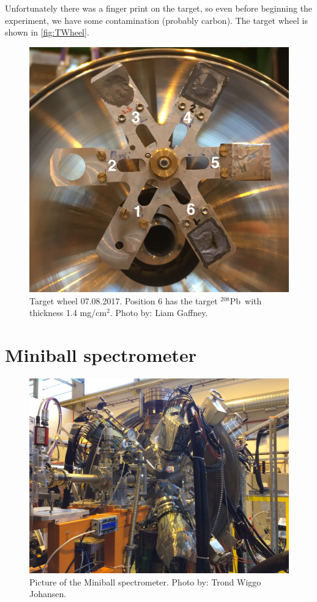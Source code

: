 \documentclass[twoside,english]{uiofysmaster/uiofysmaster}
\newcommand{\Pb}{$^{208}$Pb}
\begin{document}
Unfortunately there was a finger print on the target, so even before beginning the experiment, we have some contamination (probably carbon). The target wheel is shown in \autoref{fig:TWheel}. 

\begin{figure}[ht]
	\centering
	\includegraphics[width=\linewidth]{Images/Target-wheel.png}
	\caption{Target wheel 07.08.2017. Position 6 has the target \Pb\ with thickness 1.4 mg/cm$^2$. Photo by: Liam Gaffney.}
	\label{fig:TWheel}
\end{figure}



\section{Miniball spectrometer}


\begin{figure}[ht]
	\centering
	\includegraphics[width=\linewidth]{Images/IMG3849.JPG}
	\caption{Picture of the Miniball spectrometer. Photo by: Trond Wiggo Johansen.}
	\label{fig:MBSpect}
\end{figure}
\end{document}
